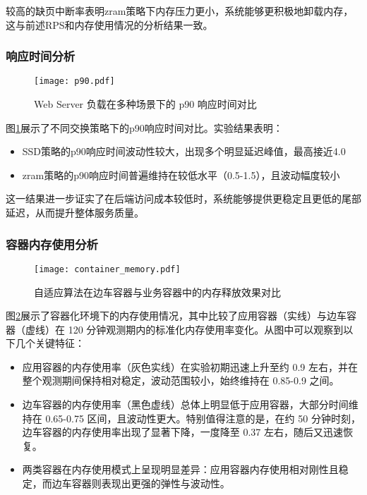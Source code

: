 较高的缺页中断率表明zram策略下内存压力更小，系统能够更积极地卸载内存，这与前述RPS和内存使用情况的分析结果一致。

\subsubsection{响应时间分析}
\begin{figure}[htb]
    \centering
    \texttt{[image: p90.pdf]}
    \caption{Web Server 负载在多种场景下的 p90 响应时间对比}
    \label{fig:p90}
\end{figure}
图\ref{fig:p90}展示了不同交换策略下的p90响应时间对比。实验结果表明：
\begin{itemize}
    \item SSD策略的p90响应时间波动性较大，出现多个明显延迟峰值，最高接近4.0
    \item zram策略的p90响应时间普遍维持在较低水平（0.5-1.5），且波动幅度较小
\end{itemize}

这一结果进一步证实了在后端访问成本较低时，系统能够提供更稳定且更低的尾部延迟，从而提升整体服务质量。

\subsubsection{容器内存使用分析}
\begin{figure}[htbp]
    \centering
    \texttt{[image: container\_memory.pdf]}
    \caption{自适应算法在边车容器与业务容器中的内存释放效果对比}
    \label{fig:container_memory}
\end{figure}
图\ref{fig:container_memory}展示了容器化环境下的内存使用情况，其中比较了应用容器（实线）与边车容器（虚线）在 120 分钟观测期内的标准化内存使用率变化。从图中可以观察到以下几个关键特征：
\begin{itemize}
    \item 应用容器的内存使用率（灰色实线）在实验初期迅速上升至约 0.9 左右，并在整个观测期间保持相对稳定，波动范围较小，始终维持在 0.85-0.9 之间。
    \item 边车容器的内存使用率（黑色虚线）总体上明显低于应用容器，大部分时间维持在 0.65-0.75 区间，且波动性更大。特别值得注意的是，在约 50 分钟时刻，边车容器的内存使用率出现了显著下降，一度降至 0.37 左右，随后又迅速恢复。
    \item 两类容器在内存使用模式上呈现明显差异：应用容器内存使用相对刚性且稳定，而边车容器则表现出更强的弹性与波动性。
\end{itemize}

